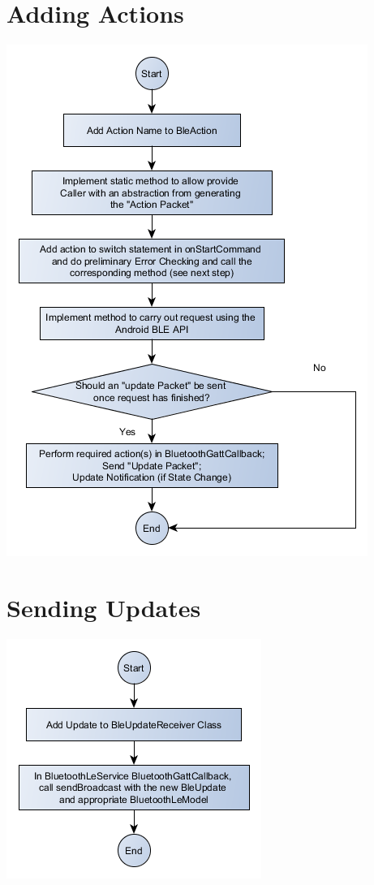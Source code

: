 \documentclass{scrreprt}
\begin{document}
\section{Adding Actions}
\includegraphics[width=\textwidth]{AddActionFlowchart}

\section{Sending Updates}
\includegraphics[width=\textwidth]{AddUpdateFlowchart}
\end{document}
